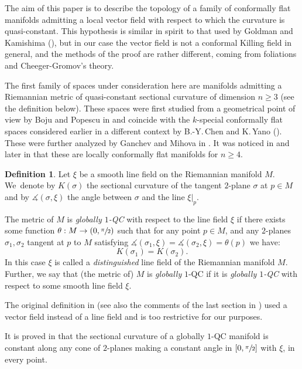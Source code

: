 \documentclass[10pt]{amsart}
\theoremstyle{definition}
\newtheorem{definition}[theorem]{Definition}
\theoremstyle{remark}
\numberwithin{equation}{section}
\begin{document}
The aim of this paper is to describe the
topology of a family of conformally flat
manifolds admitting a local vector field with respect to which
the curvature is quasi-constant. This hypothesis is similar in spirit
to that used by Goldman and Kamishima (\cite{Go-Kam}), but in our case
the vector field is not a conformal Killing field in general,
and the methods of the proof are rather different, coming from foliations and
Cheeger-Gromov's theory.

The first family of spaces under consideration here are manifolds admitting a Riemannian
metric of quasi-constant sectional curvature of dimension $n\geq3$ (see the definition below).
These spaces were first studied from a geometrical point of view
by Boju and Popescu in \cite{BP} and coincide with the
$k$-special conformally flat spaces considered earlier in a different context
by B.-Y.\,Chen and K.\,Yano (\cite{H,CY}). These were further analyzed by Ganchev and Mihova in \cite{GM}.
It was noticed in \cite{BF,H} and later
in \cite{GM} that these are locally conformally flat manifolds for $n\geq4$.

\begin{definition}
Let $\xi$ be a smooth line field on the Riemannian manifold $M$.
We~denote by $K(\sigma)$ the sectional curvature
of the tangent $2$\nobreakdash-plane $\sigma$ at $p\in M$ and by
$\measuredangle(\sigma,\xi)$ the angle between $\sigma$ and the line $\xi|_p$.

The metric of $M$ is \emph{globally $1$-QC} with
respect to the line field $\xi$ if there exists some function
$\theta: M\to (0,\sfrac{\pi}{2})$ such that for any
point $p\in M$, and any $2$\nobreakdash-planes $\sigma_1,\sigma_2$ tangent at $p$ to $M$ satisfying
$ \measuredangle(\sigma_1,\xi)=\measuredangle(\sigma_2,\xi)=\theta(p)$
we have:
\[ K(\sigma_1)=K(\sigma_2).\]
In this case $\xi$ is called a \emph{distinguished} line field of the Riemannian manifold $M$.
Further, we say that (the metric of) $M$ is \emph{globally} $1$-QC if it is \emph{globally $1$-QC}
with respect to some smooth line field $\xi$.
\end{definition}

The original definition in \cite{BP,GM} (see also the
comments of the last section in \cite{BP}) used a vector field instead of a line field and is
too restrictive for our purposes.

It is proved in \cite{BP} that the sectional curvature of a globally $1$-QC manifold is constant along any cone of $2$\nobreakdash-planes making a constant angle in $[0,\sfrac{\pi}{2}]$ with $\xi$,
in every point.
\end{document}
